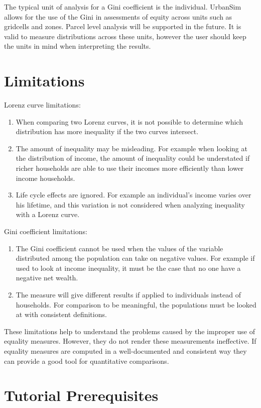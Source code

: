 \documentclass{howto}
\begin{document}
The typical unit of analysis for a Gini coefficient is the individual.  UrbanSim allows for the use of the Gini
in assessments of equity across units such as gridcells and zones.  Parcel level
analysis will be supported in the future.  It is valid to measure distributions across 
these units, however the user should keep the units in mind when interpreting the results.

\section{Limitations}

Lorenz curve limitations:
\begin{enumerate}
\item When comparing two Lorenz curves, it is not possible to determine which distribution has more inequality if the two curves intersect. 
\item The amount of inequality may be misleading.  For example when looking at the distribution of income, the amount of inequality could be understated if richer households are able to use their incomes more efficiently than lower income households.
\item Life cycle effects are ignored. For example an individual's income varies over his lifetime, and this variation is not considered when analyzing inequality with a Lorenz curve.
\end{enumerate}

Gini coefficient limitations:
\begin{enumerate}
\item The Gini coefficient cannot be used when the values of the variable distributed among the population can take on negative values.  For example if used to look at income inequality, it must be the case that no one have a negative net wealth.
\item The measure will give different results if applied to individuals instead of households.  For comparison to be meaningful, the populations must be looked at with consistent definitions.


\end{enumerate}
These limitations help to understand the problems caused by the improper use of equality 
measures. However, they do not render these measurements ineffective. If equality measures 
are computed in a well-documented and consistent way they can provide a good tool for 
quantitative comparisons.

\section{Tutorial Prerequisites}
\end{document}
